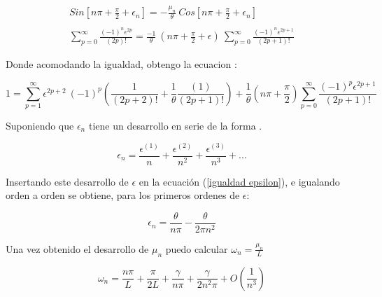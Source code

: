 \begin{equation}
\begin{array}{c}
    Sin[ n \pi + \frac{\pi}{2} + \epsilon _n ] = 
    - \frac{\mu _n}{\theta}  \ Cos[ n \pi + \frac{\pi}{2} + \epsilon _n ]  \\
 \\

         \sum _{p=0} ^{\infty} \frac{(-1) ^n  \epsilon ^{2 p }}{(2p)!} 
    =  \frac{-1}{\theta}  \ (n \pi + \frac{\pi}{2} + \epsilon ) \
     \sum _{p=0} ^{\infty} \frac{(-1) ^n \epsilon ^{2 p + 1}}{(2p+1)!} 
\end{array}
\end{equation}


Donde acomodando la igualdad, obtengo la ecuacion :

\begin{equation}
    1 = \sum _{p=1} ^{\infty} \epsilon ^{2p+2} \ (-1) ^p
    \left( 
    \frac{1}{(2p+2)!} + \frac{1}{\theta} \frac{(1 )}{(2p+1)!} 
    \right ) +
    \frac{1}{\theta} \left(n \pi + \frac{\pi}{2} \right)
    \sum _{p=0} ^{\infty} \frac{(-1) ^p \epsilon ^{2p+1}}{(2p+1) !}
\label{igualdad epsilon}
\end{equation}

Suponiendo que $\epsilon _n $ tiene un desarrollo en serie de la forma .

\begin{equation}
    \epsilon _n = 
    \frac{\epsilon ^{(1)}}{n}  + 
    \frac{\epsilon ^{(2)}}{n ^2}  + 
    \frac{\epsilon ^{(3)}}{n ^3}  + ...
\label{eq.epsilon}
\end{equation}


Insertando este desarrollo de $\epsilon$ en la ecuación (\ref{igualdad epsilon}), e igualando orden a orden se obtiene, para los primeros ordenes de $\epsilon$:

\begin{equation}
    \epsilon _n = \frac{\theta}{n \pi} 
     - \frac{ \theta}{2 \pi n ^2 } 
\label{epsilons}
\end{equation}

Una vez obtenido el desarrollo de $\mu _n $ puedo calcular $\omega _n = \frac{\mu _n }{L}  $ 



\begin{equation}
    \omega _n = 
	\frac{n \pi}{L} + 
    \frac{\pi}{2 L} +
    \frac{\gamma}{n \pi} +
    \frac{\gamma}{2 n ^2 \pi} +
    O \left(  \frac{1}{n^3} \right) 
\end{equation}
    
